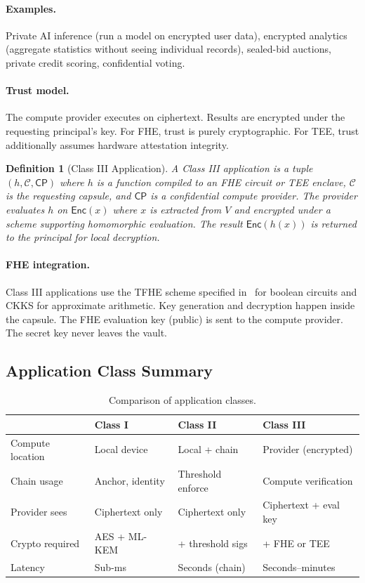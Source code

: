 \documentclass[11pt,a4paper]{article}
\newtheorem{definition}{Definition}[section]
\begin{document}
\paragraph{Examples.} Private AI inference (run a model on encrypted user data),
encrypted analytics (aggregate statistics without seeing individual records),
sealed-bid auctions, private credit scoring, confidential voting.

\paragraph{Trust model.} The compute provider executes on ciphertext. Results
are encrypted under the requesting principal's key. For FHE, trust is purely
cryptographic. For TEE, trust additionally assumes hardware attestation
integrity.

\begin{definition}[Class III Application]\label{def:class3}
A Class III application is a tuple $(h, \mathcal{C}, \mathsf{CP})$ where
$h$ is a function compiled to an FHE circuit or TEE enclave, $\mathcal{C}$ is
the requesting capsule, and $\mathsf{CP}$ is a confidential compute provider.
The provider evaluates $h$ on $\mathsf{Enc}(x)$ where $x$ is extracted from $V$
and encrypted under a scheme supporting homomorphic evaluation. The result
$\mathsf{Enc}(h(x))$ is returned to the principal for local decryption.
\end{definition}

\paragraph{FHE integration.} Class III applications use the TFHE scheme specified
in~\cite{lux-tfhe} for boolean circuits and CKKS for approximate arithmetic.
Key generation and decryption happen inside the capsule. The FHE evaluation key
(public) is sent to the compute provider. The secret key never leaves the vault.

\subsection{Application Class Summary}

\begin{table}[H]
\centering
\caption{Comparison of application classes.}
\label{tab:classes}
\begin{tabular}{@{}llll@{}}
\toprule
& \textbf{Class I} & \textbf{Class II} & \textbf{Class III} \\
\midrule
Compute location & Local device & Local + chain & Provider (encrypted) \\
Chain usage & Anchor, identity & Threshold enforce & Compute verification \\
Provider sees & Ciphertext only & Ciphertext only & Ciphertext + eval key \\
Crypto required & AES + ML-KEM & + threshold sigs & + FHE or TEE \\
Latency & Sub-ms & Seconds (chain) & Seconds--minutes \\
\bottomrule
\end{tabular}
\end{table}
\end{document}
